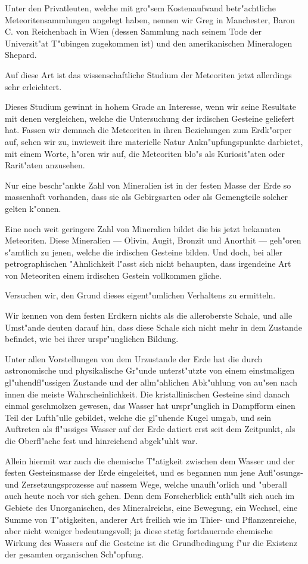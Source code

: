 \documentclass[a4paper, 11pt, oneside]{article}
\begin{document}
Unter den Privatleuten, welche mit gro"sem Kostenaufwand betr"achtliche Meteoritensammlungen angelegt haben, nennen wir Greg in Manchester, Baron C. von Reichenbach in Wien (dessen Sammlung nach seinem Tode der Universit"at T"ubingen zugekommen ist) und den amerikanischen Mineralogen Shepard.

Auf diese Art ist das wissenschaftliche Studium der Meteoriten jetzt allerdings sehr erleichtert.

Dieses Studium gewinnt in hohem Grade an Interesse, wenn wir seine Resultate mit denen vergleichen, welche die Untersuchung der irdischen Gesteine geliefert hat. Fassen wir demnach die Meteoriten in ihren Beziehungen zum Erdk"orper auf, sehen wir zu, inwieweit ihre materielle Natur Ankn"upfungspunkte darbietet, mit einem Worte, h"oren wir auf, die Meteoriten blo"s als Kuriosit"aten oder Rarit"aten anzusehen.

Nur eine beschr"ankte Zahl von Mineralien ist in der festen Masse der Erde so massenhaft vorhanden, dass sie als Gebirgsarten oder als Gemengteile solcher gelten k"onnen.

Eine noch weit geringere Zahl von Mineralien bildet die bis jetzt bekannten Meteoriten. Diese Mineralien --- Olivin, Augit, Bronzit und Anorthit --- geh"oren s"amtlich zu jenen, welche die irdischen Gesteine bilden. Und doch, bei aller petrographischen "Ahnlichkeit l"asst sich nicht behaupten, dass irgendeine Art von Meteoriten einem irdischen Gestein vollkommen gliche.

Versuchen wir, den Grund dieses eigent"umlichen Verhaltens zu ermitteln.

Wir kennen von dem festen Erdkern nichts als die alleroberste Schale, und alle Umst"ande deuten darauf hin, dass diese Schale sich nicht mehr in dem Zustande befindet, wie bei ihrer urspr"unglichen Bildung.

Unter allen Vorstellungen von dem Urzustande der Erde hat die durch astronomische und physikalische Gr"unde unterst"utzte von einem einstmaligen gl"uhendfl"ussigen Zustande und der allm"ahlichen Abk"uhlung von au"sen nach innen die meiste Wahrscheinlichkeit. Die kristallinischen Gesteine sind danach einmal geschmolzen gewesen, das Wasser hat urspr"unglich in Dampfform einen Teil der Lufth"ulle gebildet, welche die gl"uhende Kugel umgab, und sein Auftreten als fl"ussiges Wasser auf der Erde datiert erst seit dem Zeitpunkt, als die Oberfl"ache fest und hinreichend abgek"uhlt war.

Allein hiermit war auch die chemische T"atigkeit zwischen dem Wasser und der festen Gesteinsmasse der Erde eingeleitet, und es begannen nun jene Aufl"osungs- und Zersetzungsprozesse auf nassem Wege, welche unaufh"orlich und "uberall auch heute noch vor sich gehen. Denn dem Forscherblick enth"ullt sich auch im Gebiete des Unorganischen, des Mineralreichs, eine Bewegung, ein Wechsel, eine Summe von T"atigkeiten, anderer Art freilich wie im Thier- und Pflanzenreiche, aber nicht weniger bedeutungsvoll; ja diese stetig fortdauernde chemische Wirkung des Wassers auf die Gesteine ist die Grundbedingung f"ur die Existenz der gesamten organischen Sch"opfung.
\end{document}
